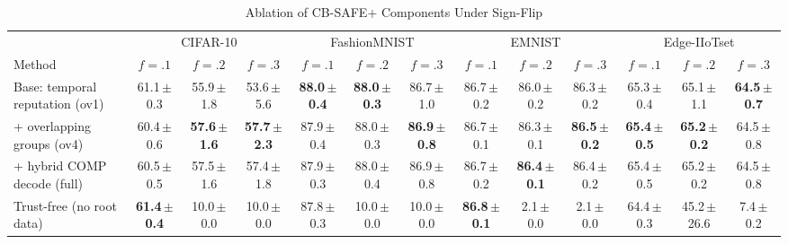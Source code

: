 \begin{table}[!t]\centering\footnotesize
\caption{Ablation of CB-SAFE+ Components Under Sign-Flip}
\label{tab:ablation-variants}
\setlength{\tabcolsep}{1.5pt}
\begin{tabular}{@{}lcccccccccccc@{}}\toprule
& \multicolumn{3}{c}{CIFAR-10} & \multicolumn{3}{c}{FashionMNIST} & \multicolumn{3}{c}{EMNIST} & \multicolumn{3}{c}{Edge-IIoTset}\\
\cmidrule(lr){2-4}\cmidrule(lr){5-7}\cmidrule(lr){8-10}\cmidrule(l){11-13}
Method & $f{=}.1$ & $f{=}.2$ & $f{=}.3$ & $f{=}.1$ & $f{=}.2$ & $f{=}.3$ & $f{=}.1$ & $f{=}.2$ & $f{=}.3$ & $f{=}.1$ & $f{=}.2$ & $f{=}.3$\\\midrule
Base: temporal reputation (ov1) & 61.1\,{\scriptsize$\pm$0.3} & 55.9\,{\scriptsize$\pm$1.8} & 53.6\,{\scriptsize$\pm$5.6} & \textbf{88.0\,{\scriptsize$\pm$0.4}} & \textbf{88.0\,{\scriptsize$\pm$0.3}} & 86.7\,{\scriptsize$\pm$1.0} & 86.7\,{\scriptsize$\pm$0.2} & 86.0\,{\scriptsize$\pm$0.2} & 86.3\,{\scriptsize$\pm$0.2} & 65.3\,{\scriptsize$\pm$0.4} & 65.1\,{\scriptsize$\pm$1.1} & \textbf{64.5\,{\scriptsize$\pm$0.7}}\\
\;+ overlapping groups (ov4) & 60.4\,{\scriptsize$\pm$0.6} & \textbf{57.6\,{\scriptsize$\pm$1.6}} & \textbf{57.7\,{\scriptsize$\pm$2.3}} & 87.9\,{\scriptsize$\pm$0.4} & 88.0\,{\scriptsize$\pm$0.3} & \textbf{86.9\,{\scriptsize$\pm$0.8}} & 86.7\,{\scriptsize$\pm$0.1} & 86.3\,{\scriptsize$\pm$0.1} & \textbf{86.5\,{\scriptsize$\pm$0.2}} & \textbf{65.4\,{\scriptsize$\pm$0.5}} & \textbf{65.2\,{\scriptsize$\pm$0.2}} & 64.5\,{\scriptsize$\pm$0.8}\\
\;+ hybrid COMP decode (full) & 60.5\,{\scriptsize$\pm$0.5} & 57.5\,{\scriptsize$\pm$1.6} & 57.4\,{\scriptsize$\pm$1.8} & 87.9\,{\scriptsize$\pm$0.3} & 88.0\,{\scriptsize$\pm$0.4} & 86.9\,{\scriptsize$\pm$0.8} & 86.7\,{\scriptsize$\pm$0.2} & \textbf{86.4\,{\scriptsize$\pm$0.1}} & 86.4\,{\scriptsize$\pm$0.2} & 65.4\,{\scriptsize$\pm$0.5} & 65.2\,{\scriptsize$\pm$0.2} & 64.5\,{\scriptsize$\pm$0.8}\\
Trust-free (no root data) & \textbf{61.4\,{\scriptsize$\pm$0.4}} & 10.0\,{\scriptsize$\pm$0.0} & 10.0\,{\scriptsize$\pm$0.0} & 87.8\,{\scriptsize$\pm$0.3} & 10.0\,{\scriptsize$\pm$0.0} & 10.0\,{\scriptsize$\pm$0.0} & \textbf{86.8\,{\scriptsize$\pm$0.1}} & 2.1\,{\scriptsize$\pm$0.0} & 2.1\,{\scriptsize$\pm$0.0} & 64.4\,{\scriptsize$\pm$0.3} & 45.2\,{\scriptsize$\pm$26.6} & 7.4\,{\scriptsize$\pm$0.2}\\
\bottomrule\end{tabular}
\end{table}